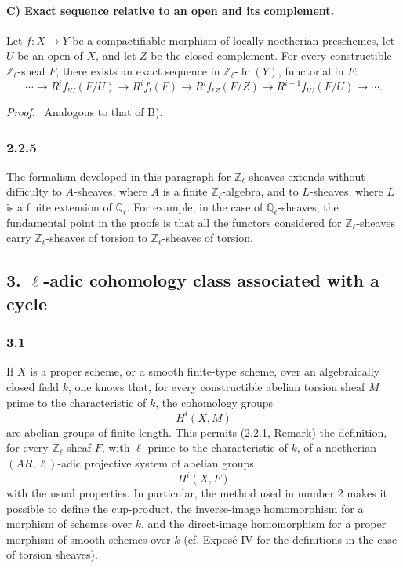 \documentclass[11pt]{article}
\newenvironment{prooftext}[1][Proof]{\par\noindent\emph{#1.}\ }{\par\medskip}
\providecommand{\fc}{\operatorname{fc}}
\begin{document}
\paragraph{C) Exact sequence relative to an open and its complement.}
Let \(f:X\to Y\) be a compactifiable morphism of locally noetherian preschemes, let \(U\) be an open of \(X\), and let \(Z\) be the closed complement. For every constructible \(\mathbb Z_\ell\)-sheaf \(F\), there exists an exact sequence in \(\mathbb Z_\ell\text{-}\fc(Y)\), functorial in \(F\):
\[
\cdots\longrightarrow R^if_{!U}(F/U)
\longrightarrow R^if_!(F)
\longrightarrow R^if_{!Z}(F/Z)
\longrightarrow R^{i+1}f_{!U}(F/U)
\longrightarrow\cdots .
\]

\begin{prooftext}[Proof]
Analogous to that of B).
\end{prooftext}

\subsubsection*{2.2.5}
The formalism developed in this paragraph for \(\mathbb Z_\ell\)-sheaves extends without difficulty to \(A\)-sheaves, where \(A\) is a finite \(\mathbb Z_\ell\)-algebra, and to \(L\)-sheaves, where \(L\) is a finite extension of \(\mathbb Q_\ell\). For example, in the case of \(\mathbb Q_\ell\)-sheaves, the fundamental point in the proofs is that all the functors considered for \(\mathbb Z_\ell\)-sheaves carry \(\mathbb Z_\ell\)-sheaves of torsion to \(\mathbb Z_\ell\)-sheaves of torsion.

\subsection*{3. \(\ell\)-adic cohomology class associated with a cycle}

\subsubsection*{3.1}
If \(X\) is a proper scheme, or a smooth finite-type scheme, over an algebraically closed field \(k\), one knows that, for every constructible abelian torsion sheaf \(M\) prime to the characteristic of \(k\), the cohomology groups
\[
H^i(X,M)
\]
are abelian groups of finite length. This permits (2.2.1, Remark) the definition, for every \(\mathbb Z_\ell\)-sheaf \(F\), with \(\ell\) prime to the characteristic of \(k\), of a noetherian \((AR,\ell)\)-adic projective system of abelian groups
\[
H^i(X,F)
\]
with the usual properties. In particular, the method used in number 2 makes it possible to define the cup-product, the inverse-image homomorphism for a morphism of schemes over \(k\), and the direct-image homomorphism for a proper morphism of smooth schemes over \(k\) (cf. Exposé IV for the definitions in the case of torsion sheaves).
\end{document}
